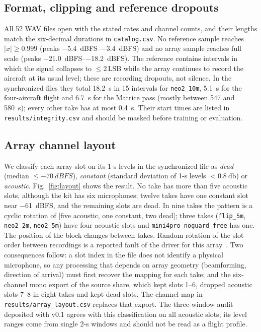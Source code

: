 \documentclass[journal]{IEEEtran}
\begin{document}
\subsection{Format, clipping and reference dropouts}
All 52 WAV files open with the stated rates and channel counts, and their lengths match the six-decimal durations in \texttt{catalog.csv}.
No reference sample reaches $|x|\ge0.999$ (peaks \SIrange{-5.4}{-3.4}{dBFS}) and no array sample reaches full scale (peaks \SIrange{-21.0}{-18.2}{dBFS}).
The reference contains intervals in which the signal collapses to $\le$2\,LSB while the array continues to record the aircraft at its usual level; these are recording dropouts, not silence.
In the synchronized files they total \SI{18.2}{\second} in 15 intervals for \texttt{neo2\_10m}, \SI{5.1}{\second} for the four-aircraft flight and \SI{6.7}{\second} for the Matrice pass (mostly between 547 and \SI{580}{\second}); every other take has at most \SI{0.4}{\second}.
Their start times are listed in \texttt{results/integrity.csv} and should be masked before training or evaluation.

\subsection{Array channel layout}\label{sec:layout}
We classify each array slot on its 1-s levels in the synchronized file as \emph{dead} (median $\le\SI{-70}{dBFS}$), \emph{constant} (standard deviation of 1-s levels $<\SI{0.8}{\decibel}$) or \emph{acoustic}.
Fig.~\ref{fig:layout} shows the result.
No take has more than five acoustic slots, although the kit has six microphones; twelve takes have one constant slot near \SI{-61}{dBFS}, and the remaining slots are dead.
In nine takes the pattern is a cyclic rotation of [five acoustic, one constant, two dead]; three takes (\texttt{flip\_5m}, \texttt{neo2\_2m}, \texttt{neo2\_5m}) have four acoustic slots and \texttt{mini4pro\_noguard\_free} has one.
The position of the block changes between takes.
Random rotation of the slot order between recordings is a reported fault of the driver for this array~\cite{seeedissue309}.
Two consequences follow: a slot index in the file does not identify a physical microphone, so any processing that depends on array geometry (beamforming, direction of arrival) must first recover the mapping for each take; and the six-channel mono export of the source share, which kept slots 1--6, dropped acoustic slots 7--8 in eight takes and kept dead slots.
The channel map in \texttt{results/array\_layout.csv} replaces that export.
The three-window audit deposited with v0.1 agrees with this classification on all acoustic slots; its level ranges come from single 2-s windows and should not be read as a flight profile.
\end{document}
